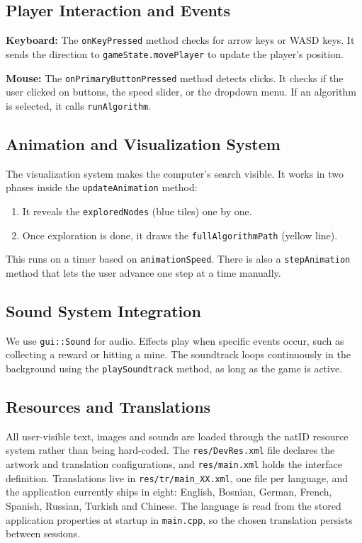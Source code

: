 \documentclass[12pt, a4paper]{article}
\newcommand{\code}[1]{\texttt{#1}}
\begin{document}
\subsection{Player Interaction and Events}
\textbf{Keyboard:} The \code{onKeyPressed} method checks for arrow keys or WASD keys. It sends the direction to \code{gameState.movePlayer} to update the player's position.

\textbf{Mouse:} The \code{onPrimaryButtonPressed} method detects clicks. It checks if the user clicked on buttons, the speed slider, or the dropdown menu. If an algorithm is selected, it calls \code{runAlgorithm}.

\subsection{Animation and Visualization System}
The visualization system makes the computer's search visible. It works in two phases inside the \code{updateAnimation} method:
\begin{enumerate}
    \item It reveals the \code{exploredNodes} (blue tiles) one by one.
    \item Once exploration is done, it draws the \code{fullAlgorithmPath} (yellow line).
\end{enumerate}
This runs on a timer based on \code{animationSpeed}. There is also a \code{stepAnimation} method that lets the user advance one step at a time manually.

\subsection{Sound System Integration}
We use \code{gui::Sound} for audio. Effects play when specific events occur, such as collecting a reward or hitting a mine. The soundtrack loops continuously in the background using the \code{playSoundtrack} method, as long as the game is active.

\subsection{Resources and Translations}
All user-visible text, images and sounds are loaded through the natID resource system rather than being hard-coded. The \code{res/DevRes.xml} file declares the artwork and translation configurations, and \code{res/main.xml} holds the interface definition. Translations live in \code{res/tr/main\_XX.xml}, one file per language, and the application currently ships in eight: English, Bosnian, German, French, Spanish, Russian, Turkish and Chinese. The language is read from the stored application properties at startup in \code{main.cpp}, so the chosen translation persists between sessions.
\end{document}
